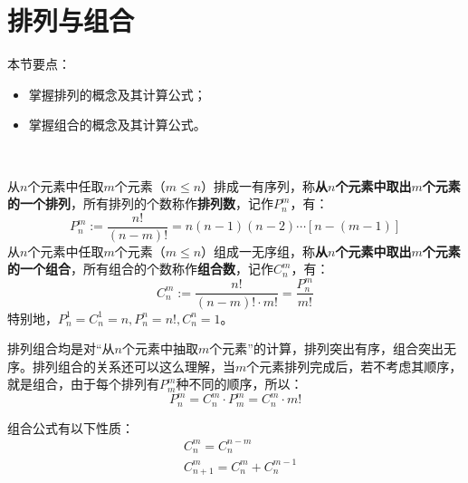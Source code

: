\section{排列与组合}

本节要点：
\begin{itemize}
    \item 掌握排列的概念及其计算公式；
    \item 掌握组合的概念及其计算公式。
\end{itemize}

~

\begin{definition}[排列和组合]
从$n$个元素中任取$m$个元素（$m\leqslant n$）排成一有序列，称{\bf 从$n$个元素中取出$m$个元素的一个排列}，所有排列的个数称作{\bf 排列数}，记作$P_{n}^{m}$，有：
\[
P_{n}^{m}:=\frac{n!}{\left( n-m \right) !}=n\left( n-1 \right) \left( n-2 \right) \cdots \left[ n-\left( m-1 \right) \right]
\]
从$n$个元素中任取$m$个元素（$m\leqslant n$）组成一无序组，称{\bf 从$n$个元素中取出$m$个元素的一个组合}，所有组合的个数称作{\bf 组合数}，记作$C_{n}^{m}$，有：
\[
C_{n}^{m}:=\frac{n!}{\left( n-m \right) !\cdot m!}=\frac{P_{n}^{m}}{m!}
\]
特别地，$P_{n}^{1}=C_{n}^{1}=n,P_{n}^{n}=n!,C_{n}^{n}=1$。
\end{definition}

排列组合均是对“从$n$个元素中抽取$m$个元素”的计算，排列突出有序，组合突出无序。排列组合的关系还可以这么理解，当$m$个元素排列完成后，若不考虑其顺序，就是组合，由于每个排列有$P_{m}^{m}$种不同的顺序，所以：
\[
P_{n}^{m}=C_{n}^{m}\cdot P_{m}^{m}=C_{n}^{m}\cdot m!
\]

\begin{theorem}
组合公式有以下性质：
\begin{align*}
&C_{n}^{m}=C_{n}^{n-m} \\
&C_{n+1}^{m}=C_{n}^{m}+C_{n}^{m-1}
\end{align*}
\end{theorem}




